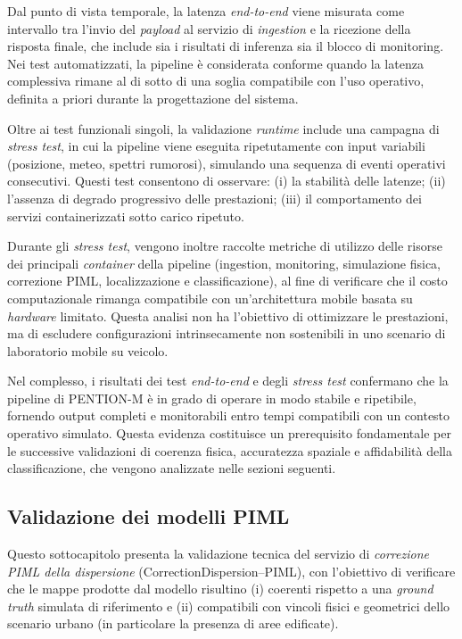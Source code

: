 Dal punto di vista temporale, la latenza \textit{end-to-end} viene misurata come intervallo tra l’invio del \textit{payload} al servizio di \textit{ingestion} e la ricezione della risposta finale, che include sia i risultati di inferenza sia il blocco di monitoring.
Nei test automatizzati, la pipeline è considerata conforme quando la latenza complessiva rimane al di sotto di una soglia compatibile con l’uso operativo, definita a priori durante la progettazione del sistema.

Oltre ai test funzionali singoli, la validazione \textit{runtime} include una campagna di \textit{stress test}, in cui la pipeline viene eseguita ripetutamente con input variabili (posizione, meteo, spettri rumorosi), simulando una sequenza di eventi operativi consecutivi.
Questi test consentono di osservare:
(i) la stabilità delle latenze;
(ii) l’assenza di degrado progressivo delle prestazioni;
(iii) il comportamento dei servizi containerizzati sotto carico ripetuto.

Durante gli \textit{stress test}, vengono inoltre raccolte metriche di utilizzo delle risorse dei principali \textit{container} della pipeline (ingestion, monitoring, simulazione fisica, correzione PIML, localizzazione e classificazione), al fine di verificare che il costo computazionale rimanga compatibile con un’architettura mobile basata su \textit{hardware} limitato.
Questa analisi non ha l’obiettivo di ottimizzare le prestazioni, ma di escludere configurazioni intrinsecamente non sostenibili in uno scenario di laboratorio mobile su veicolo.

Nel complesso, i risultati dei test \textit{end-to-end} e degli \textit{stress test} confermano che la pipeline di \textsc{PENTION-M} è in grado di operare in modo stabile e ripetibile, fornendo output completi e monitorabili entro tempi compatibili con un contesto operativo simulato.
Questa evidenza costituisce un prerequisito fondamentale per le successive validazioni di coerenza fisica, accuratezza spaziale e affidabilità della classificazione, che vengono analizzate nelle sezioni seguenti.

\subsection{Validazione dei modelli PIML}
\label{sec:val_piml}

Questo sottocapitolo presenta la validazione tecnica del servizio di \emph{correzione PIML della dispersione} (CorrectionDispersion--PIML), con l’obiettivo di verificare che le mappe prodotte dal modello risultino (i) coerenti rispetto a una \emph{ground truth} simulata di riferimento e (ii) compatibili con vincoli fisici e geometrici dello scenario urbano (in particolare la presenza di aree edificate).


